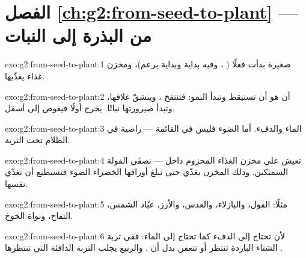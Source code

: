 \section*{الفصل \ref{ch:g2:from-seed-to-plant} --- من البذرة إلى النبات}

\begin{solution}{exo:g2:from-seed-to-plant:1}
 صغيرة بدأت فعلًا ( ، وفيه بداية  وبداية برعم)،
ومخزن غذاء يغذّيها.
\end{solution}

\begin{solution}{exo:g2:from-seed-to-plant:2}
أن  هو أن تستيقظ وتبدأ النمو: فتنتفخ ، وينشقّ غلافها،
وتبدأ صيرورتها نباتًا.  يخرج أولًا فيغوص إلى أسفل.
\end{solution}

\begin{solution}{exo:g2:from-seed-to-plant:3}
الماء والدفء. أما الضوء فليس في القائمة ---   راضية في
الظلام تحت التربة.
\end{solution}

\begin{solution}{exo:g2:from-seed-to-plant:4}
تعيش على مخزن الغذاء المحزوم داخل  --- نصفَي الفولة
السميكين. وذلك المخزن يغذّي  حتى تبلغ أوراقها الخضراء الضوء
فتستطيع أن تغذّي نفسها.
\end{solution}

\begin{solution}{exo:g2:from-seed-to-plant:5}
مثلًا: الفول، والبازلاء، والعدس، والأرز،  عبّاد الشمس، 
التفاح، ونواة الخوخ.
\end{solution}

\begin{solution}{exo:g2:from-seed-to-plant:6}
لأن  تحتاج إلى الدفء كما تحتاج إلى الماء: ففي تربة الشتاء
الباردة تنتظر أو تتعفن بدل أن . والربيع يجلب التربة الدافئة
التي تنتظرها .
\end{solution}

